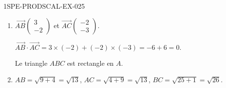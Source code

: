 \begin{corrige}{1SPE-PRODSCAL-EX-025}
\begin{enumerate}
\item $\overrightarrow{AB}\begin{pmatrix} 3 \\ -2 \end{pmatrix}$ et $\overrightarrow{AC}\begin{pmatrix} -2 \\ -3 \end{pmatrix}$.

$\overrightarrow{AB} \cdot \overrightarrow{AC} = 3 \times (-2) + (-2) \times (-3) = -6 + 6 = 0$.

Le triangle $ABC$ est rectangle en $A$.

\item $AB = \sqrt{9 + 4} = \sqrt{13}$, $AC = \sqrt{4 + 9} = \sqrt{13}$, $BC = \sqrt{25 + 1} = \sqrt{26}$.
\end{enumerate}
\end{corrige}
